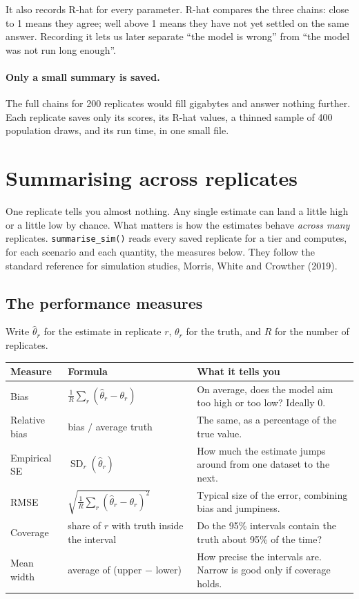 \documentclass[11pt]{article}
\newcommand{\code}[1]{\texttt{\small #1}}
\begin{document}
It also records R-hat for every parameter. R-hat compares the three chains: close to 1 means they agree; well above 1 means they have not yet settled on the same answer. Recording it lets us later separate ``the model is wrong'' from ``the model was not run long enough''.

\paragraph{Only a small summary is saved.} The full chains for 200 replicates would fill gigabytes and answer nothing further. Each replicate saves only its scores, its R-hat values, a thinned sample of 400 population draws, and its run time, in one small file.

\section{Summarising across replicates}

One replicate tells you almost nothing. Any single estimate can land a little high or a little low by chance. What matters is how the estimates behave \emph{across many} replicates. \code{summarise\_sim()} reads every saved replicate for a tier and computes, for each scenario and each quantity, the measures below. They follow the standard reference for simulation studies, Morris, White and Crowther (2019).

\subsection{The performance measures}

Write $\hat\theta_r$ for the estimate in replicate $r$, $\theta_r$ for the truth, and $R$ for the number of replicates.

\begin{center}
\small
\begin{tabularx}{\textwidth}{@{}l l X@{}}
\toprule
Measure & Formula & What it tells you \\
\midrule
Bias & $\frac1R\sum_r(\hat\theta_r - \theta_r)$ & On average, does the model aim too high or too low? Ideally 0. \\
Relative bias & bias $/$ average truth & The same, as a percentage of the true value. \\
Empirical SE & $\operatorname{SD}_r(\hat\theta_r)$ & How much the estimate jumps around from one dataset to the next. \\
RMSE & $\sqrt{\frac1R\sum_r(\hat\theta_r-\theta_r)^2}$ & Typical size of the error, combining bias and jumpiness. \\
Coverage & share of $r$ with truth inside the interval & Do the 95\% intervals contain the truth about 95\% of the time? \\
Mean width & average of (upper $-$ lower) & How precise the intervals are. Narrow is good only if coverage holds. \\
\bottomrule
\end{tabularx}
\end{center}
\end{document}
